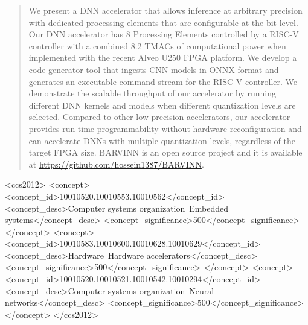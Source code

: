 \documentclass[sigconf]{acmart}
\begin{document}

\renewcommand{\shortauthors}{AskariHemmat et al}

\begin{abstract}
We present a DNN accelerator that allows inference at arbitrary precision with dedicated processing elements that are configurable at the bit level. Our DNN accelerator has 8 Processing Elements controlled by a RISC-V controller with a combined 8.2 TMACs of computational power when implemented with the  recent Alveo U250 FPGA platform. We develop a code generator tool that ingests CNN models in ONNX format and generates an executable command stream for the RISC-V controller. We demonstrate the scalable throughput of our accelerator by running different DNN kernels and models when different quantization levels are selected. Compared to other low precision accelerators, our accelerator provides run time programmability without hardware reconfiguration and can accelerate DNNs with multiple quantization levels, regardless of the target FPGA size. BARVINN is an open source project and it is available at \href{https://github.com/hossein1387/BARVINN}{https://github.com/hossein1387/BARVINN}.
\end{abstract}

\begin{CCSXML}
<ccs2012>
 <concept>
  <concept_id>10010520.10010553.10010562</concept_id>
  <concept_desc>Computer systems organization~Embedded systems</concept_desc>
  <concept_significance>500</concept_significance>
 </concept>
 <concept>
  <concept_id>10010583.10010600.10010628.10010629</concept_id>
  <concept_desc>Hardware~Hardware accelerators</concept_desc>
  <concept_significance>500</concept_significance>
 </concept>
 <concept>
  <concept_id>10010520.10010521.10010542.10010294</concept_id>
  <concept_desc>Computer systems organization~Neural networks</concept_desc>
  <concept_significance>500</concept_significance>
 </concept>
</ccs2012>
\end{CCSXML}
\end{document}
